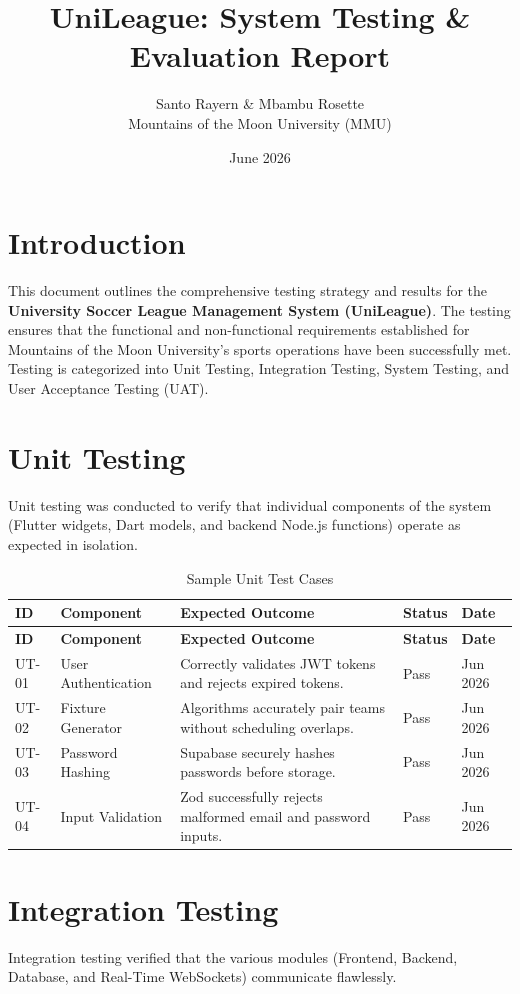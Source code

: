 \documentclass[12pt,a4paper]{article}
\title{\textbf{UniLeague: System Testing \& Evaluation Report}}
\author{Santo Rayern \& Mbambu Rosette \\ Mountains of the Moon University (MMU)}
\date{June 2026}
\begin{document}
\maketitle

\section{Introduction}
This document outlines the comprehensive testing strategy and results for the \textbf{University Soccer League Management System (UniLeague)}. The testing ensures that the functional and non-functional requirements established for Mountains of the Moon University's sports operations have been successfully met. Testing is categorized into Unit Testing, Integration Testing, System Testing, and User Acceptance Testing (UAT).

\section{Unit Testing}
Unit testing was conducted to verify that individual components of the system (Flutter widgets, Dart models, and backend Node.js functions) operate as expected in isolation.

\begin{longtable}{p{1cm}p{4cm}p{5.5cm}p{2cm}p{2cm}}
\caption{Sample Unit Test Cases} \\
\toprule
\textbf{ID} & \textbf{Component} & \textbf{Expected Outcome} & \textbf{Status} & \textbf{Date} \\
\midrule
\endfirsthead
\toprule
\textbf{ID} & \textbf{Component} & \textbf{Expected Outcome} & \textbf{Status} & \textbf{Date} \\
\midrule
\endhead
UT-01 & User Authentication & Correctly validates JWT tokens and rejects expired tokens. & Pass & Jun 2026 \\
UT-02 & Fixture Generator & Algorithms accurately pair teams without scheduling overlaps. & Pass & Jun 2026 \\
UT-03 & Password Hashing & Supabase securely hashes passwords before storage. & Pass & Jun 2026 \\
UT-04 & Input Validation & Zod successfully rejects malformed email and password inputs. & Pass & Jun 2026 \\
\bottomrule
\end{longtable}

\section{Integration Testing}
Integration testing verified that the various modules (Frontend, Backend, Database, and Real-Time WebSockets) communicate flawlessly.
\end{document}
